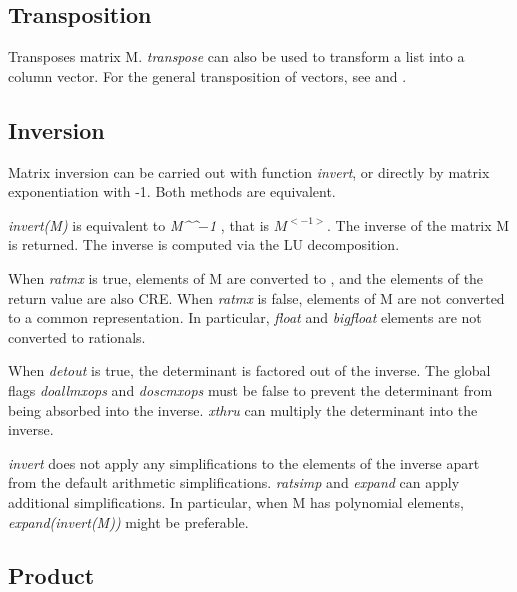 \documentclass[../Maxima_Workbook.tex]{subfiles}
\begin{document}
\subsection{Transposition}

\lz {} \hfill \tcr{[function]}

\lz Transposes matrix M. \emph{transpose} can also be used to transform a list into a column vector. For the general transposition of vectors, see  and .

\subsection{Inversion}

Matrix inversion can be carried out with function \emph{invert}, or directly by matrix exponentiation with -1. Both methods are equivalent.

\lz {} \hfill \tcr{[function]}

\lz \emph{invert(M)} is equivalent to \emph{M\textasciicircum\textasciicircum$ - $1 }, that is $ M^{<-1>} $. The inverse of the matrix M is returned. The inverse is computed via the LU decomposition. 

\lz When \emph{ratmx} is true, elements of M are converted to , and the elements of the return value are also CRE. When \emph{ratmx} is false, elements of M are not converted to a common representation. In particular, \emph{float} and \emph{bigfloat} elements are not converted to rationals. 

\lz When \emph{detout} is true, the determinant is factored out of the inverse. The global flags \emph{doallmxops} and \emph{doscmxops} must be false to prevent the determinant from being absorbed into the inverse. \emph{xthru} can multiply the determinant into the inverse. 

\lz \emph{invert} does not apply any simplifications to the elements of the inverse apart from the default arithmetic simplifications. \emph{ratsimp} and \emph{expand} can apply additional simplifications. In particular, when M has polynomial elements, \emph{expand(invert(M))} might be preferable.

\subsection{Product}
\end{document}
